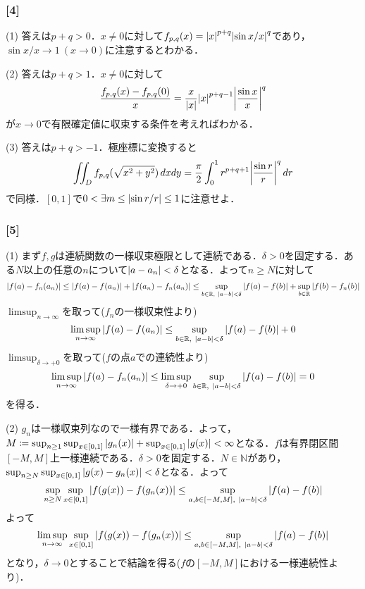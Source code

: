 \documentclass[a4j]{ltjsarticle}
\newcommand{\Rset}{\mathbb{R}}
\newcommand{\Nset}{\mathbb{N}}
\newcommand{\1}{\mathbbm{1}}
\numberwithin{equation}{section}
\theoremstyle{definition}
\begin{document}
\subsubsection*{[4]}
(1) 答えは$p+q>0$．$x\neq0$に対して$f_{p,q}(x)=\abs{x}^{p+q}\abs{\sin x/x}^q$であり，$\sin x/x\to 1\ (x\to0)$に注意するとわかる．

(2) 答えは$p+q>1$．$x\neq0$に対して
\begin{equation}
    \frac{f_{p,q}(x)-f_{p,q}(0)}{x}=\frac{x}{\abs{x}}\abs{x}^{p+q-1}\abs{\frac{\sin x}{x}}^q
\end{equation}
が$x\to0$で有限確定値に収束する条件を考えればわかる．

(3) 答えは$p+q>-1$．極座標に変換すると
\begin{equation}
    \iint_{D}f_{p,q}(\sqrt{x^2+y^2})\,dxdy =\frac{\pi}{2}\int_{0}^1r^{p+q+1}\abs{\frac{\sin r}{r}}^q\,dr
\end{equation}
で同様．$[0,1]$で$0<\exists m\leq \abs{\sin r/r}\leq 1$に注意せよ．

\subsubsection*{[5]}
(1) まず$f,g$は連続関数の一様収束極限として連続である．$\delta>0$を固定する．ある$N$以上の任意の$n$について$\abs{a-a_n}<\delta$となる．よって$n\geq N$に対して
\begin{equation}
    \abs{f(a)-f_n(a_n)}\leq \abs{f(a)-f(a_n)}+\abs{f(a_n)-f_n(a_n)}\leq \sup_{b\in \Rset,\ \abs{a-b}<\delta}\abs{f(a)-f(b)}+\sup_{b\in\Rset}\abs{f(b)-f_n(b)}
\end{equation}
$\limsup_{n\to\infty}$を取って($f_n$の一様収束性より)
\begin{equation}
    \limsup_{n\to\infty} \abs{f(a)-f(a_n)}\leq \sup_{b\in\Rset,\ \abs{a-b}<\delta}\abs{f(a)-f(b)}+0
\end{equation}
$\limsup_{\delta\to+0}$を取って($f$の点$a$での連続性より)
\begin{equation}
    \limsup_{n\to\infty}\abs{f(a)-f_n(a_n)}\leq \limsup_{\delta\to+0}\sup_{b\in\Rset,\ \abs{a-b}<\delta}\abs{f(a)-f(b)}=0
\end{equation}
を得る．

(2) $g_n$は一様収束列なので一様有界である．よって，$M\coloneq\sup_{n\geq1}\sup_{x\in[0,1]}\abs{g_n(x)}+\sup_{x\in[0,1]}\abs{g(x)}<\infty$となる．$f$は有界閉区間$[-M,M]$上一様連続である．$\delta>0$を固定する．$N\in\Nset$があり，$\sup_{n\geq N}\sup_{x\in[0,1]}\abs{g(x)-g_n(x)}<\delta$となる．よって
\begin{equation}
    \sup_{n\geq N}\sup_{x\in[0,1]}\abs{f(g(x))-f(g_n(x))}\leq \sup_{a,b\in[-M,M],\ \abs{a-b}<\delta}\abs{f(a)-f(b)}
\end{equation}
よって
\begin{equation}
    \limsup_{n\to\infty}\sup_{x\in[0,1]}\abs{f(g(x))-f(g_n(x))}\leq \sup_{a,b\in[-M,M],\ \abs{a-b}<\delta}\abs{f(a)-f(b)}
\end{equation}
となり，$\delta\to0$とすることで結論を得る($f$の$[-M,M]$における一様連続性より)．
\end{document}

